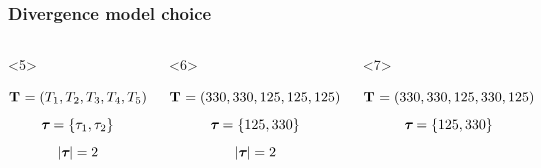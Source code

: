 \begin{frame}
    \frametitle{Divergence model choice}
    \begin{columns}[c]
            \begin{onlyenv}<5>
            \begin{displaybox}[4.5cm]
                {\small
                \[
                    \mathbf{T_{}} = (T_{1},T_{2},T_{3},T_{4},T_{5})
                \]\vspace{0mm}
                }
                \[
                    \boldsymbol{\tau_{}} = \{\tau_{1},\tau_{2}\}
                \]\vspace{0mm}
                \[
                    \lvert \boldsymbol{\tau_{}} \rvert = 2
                \]\vspace{0mm}
            \end{displaybox}
            \end{onlyenv}
            \begin{onlyenv}<6>
            \begin{displaybox}[4.5cm]
                {\small
                \[
                    \mathbf{T_{}} = (330,330,125,125,125)
                \]\vspace{0mm}
                }
                \[
                    \boldsymbol{\tau_{}} = \{125,330\}
                \]\vspace{0mm}
                \[
                    \lvert \boldsymbol{\tau_{}} \rvert = 2
                \]\vspace{0mm}
            \end{displaybox}
            \end{onlyenv}
            \begin{onlyenv}<7>
            \begin{displaybox}[4.5cm]
                {\small
                \[
                    \mathbf{T_{}} = (330,330,125,330,125)
                \]\vspace{0mm}
                }
                \[
                    \boldsymbol{\tau_{}} = \{125,330\}
                \]\vspace{0mm}

\end{displaybox}
\end{onlyenv}
\end{columns}
\end{frame}
